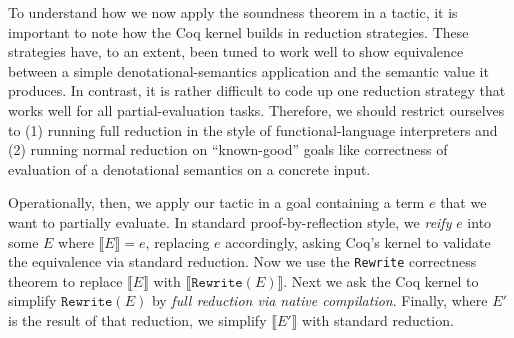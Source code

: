 \documentclass[a4paper,USenglish,cleveref,autoref,thm-restate]{lipics-v2021}
\newcommand{\citet}[1]{\usebibentry{#1}{citet}~\cite{#1}}
\begin{document}

To understand how we now apply the soundness theorem in a tactic, it is important to note how the Coq kernel builds in reduction strategies.
These strategies have, to an extent, been tuned to work well to show equivalence between a simple denotational-semantics application and the semantic value it produces.
In contrast, it is rather difficult to code up one reduction strategy that works well for all partial-evaluation tasks.
Therefore, we should restrict ourselves to (1) running full reduction in the style of functional-language interpreters and (2) running normal reduction on ``known-good'' goals like correctness of evaluation of a denotational semantics on a concrete input.

Operationally, then, we apply our tactic in a goal containing a term $e$ that we want to partially evaluate.
In standard proof-by-reflection style, we \emph{reify} $e$ into some $E$ where $\llbracket E \rrbracket = e$, replacing $e$ accordingly, asking Coq's kernel to validate the equivalence via standard reduction.
Now we use the \texttt{Rewrite} correctness theorem to replace $\llbracket E \rrbracket$ with $\llbracket \texttt{Rewrite}(E) \rrbracket$.
Next we ask the Coq kernel to simplify $\texttt{Rewrite}(E)$ by \emph{full reduction via native compilation}.
Finally, where $E'$ is the result of that reduction, we simplify $\llbracket E' \rrbracket$ with standard reduction.
\end{document}
